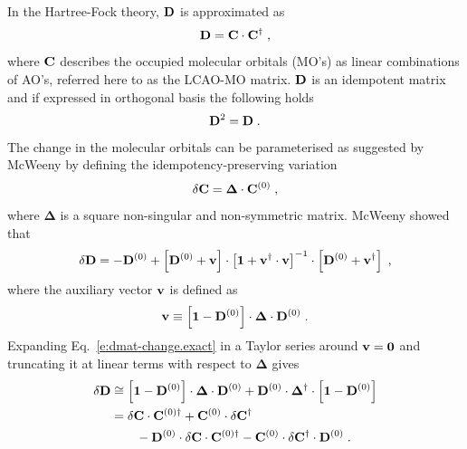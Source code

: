 \documentclass[aip,amsmath,amssymb,reprint,floatfix]{revtex4-1}
\newcommand{\BM}[1]{\bm{#1}}
\begin{document}
In the Hartree\hyp{}Fock theory,\cite{Roothaan.RevModPhys.1951} ${\bf D}$ is approximated as
%
\begin{equation}
 {\bf D} = {\bf C} \cdot {\bf C}^\dagger \;,
\end{equation}
%
where ${\bf C}$ describes the occupied molecular orbitals (MO's) as linear combinations
of AO's, referred here to as the LCAO-MO matrix.
${\bf D}$ is an idempotent matrix and if expressed in orthogonal basis the following holds
%
\begin{equation}
 {\bf D}^2 = {\bf D} \;.
\end{equation}
%
The change in the molecular orbitals can be parameterised as suggested by McWeeny\cite{McWeeny.RevModPhys.1960}
by defining the idempotency\hyp{}preserving variation
%
\begin{equation}
 \delta {\bf C} = {\BM\Delta} \cdot {\bf C}^{(0)} \;,
\end{equation}
%
where $\BM\Delta$ is a square non\hyp{}singular and non\hyp{}symmetric matrix.
McWeeny showed that
%
\begin{equation} \label{e:dmat-change.exact}
 \delta {\bf D} = -{\bf D}^{(0)} + \left[ {\bf D}^{(0)} + {\bf v} \right] \cdot
                                   \left[ {\bf 1} + {\bf v}^\dagger \cdot {\bf v} \right]^{-1} \cdot
                                   \left[ {\bf D}^{(0)} + {\bf v}^\dagger \right] \;,
\end{equation}
%
where the auxiliary vector ${\bf v}$ is defined as
%
\begin{equation}
 {\bf v} \equiv \left[ {\bf 1} - {\bf D}^{(0)} \right] \cdot {\BM\Delta} \cdot {\bf D}^{(0)}  \;.
\end{equation}
%
Expanding Eq.~\eqref{e:dmat-change.exact} in a Taylor series around ${\bf v}={\bf 0}$ and
truncating it at linear terms with respect to ${\BM\Delta}$ gives
%
\begin{subequations} 
 \begin{align}
 \delta {\bf D} &\cong \left[ {\bf 1} - {\bf D}^{(0)} \right] \cdot {\BM\Delta} \cdot {\bf D}^{(0)} + 
                        {\bf D}^{(0)} \cdot {\BM\Delta}^\dagger \cdot \left[ {\bf 1} - {\bf D}^{(0)} \right]  
 \label{e:dD-1} \\  &= 
  \delta {\bf C} \cdot {\bf C}^{(0)\dagger} + {\bf C}^{(0)} \cdot \delta {\bf C}^\dagger \nonumber \\
           &\qquad - {\bf D}^{(0)} \cdot \delta {\bf C} \cdot {\bf C}^{{(0)}\dagger} 
                   - {\bf C}^{(0)} \cdot \delta {\bf C}^\dagger \cdot {\bf D}^{(0)}  \;.
 \label{e:dD-2}
 \end{align}
\end{subequations}
\end{document}
